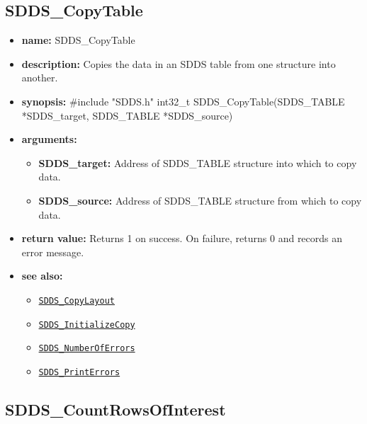 \documentclass[11pt]{article}
\newcommand{\progref}[1]{\hyperref[SDDS_#1]{\tt SDDS\_#1}}
\begin{document}
\subsection{SDDS\_CopyTable}
\label{SDDS_CopyTable}

\begin{itemize}
\item {\bf name:}\newline
SDDS\_CopyTable
\item {\bf description:}\newline
Copies the data in an SDDS table from one structure into another.
\item {\bf synopsis:} \#include "SDDS.h"\newline
int32\_t SDDS\_CopyTable(SDDS\_TABLE *SDDS\_target, SDDS\_TABLE *SDDS\_source)
\item {\bf arguments:}
\begin{itemize}
\item {\bf SDDS\_target:} Address of SDDS\_TABLE structure into which to copy data.
\item {\bf SDDS\_source:} Address of SDDS\_TABLE structure from which to copy data.
\end{itemize}
\item {\bf return value:}\newline
Returns 1 on success. On failure, returns 0 and records an error message.
\item {\bf see also:}
\begin{itemize}
\item \progref{CopyLayout}
\item \progref{InitializeCopy}
\item \progref{NumberOfErrors}
\item \progref{PrintErrors}
\end{itemize}
\end{itemize}

\subsection{SDDS\_CountRowsOfInterest}
\label{SDDS_CountRowsOfInterest}
\end{document}
